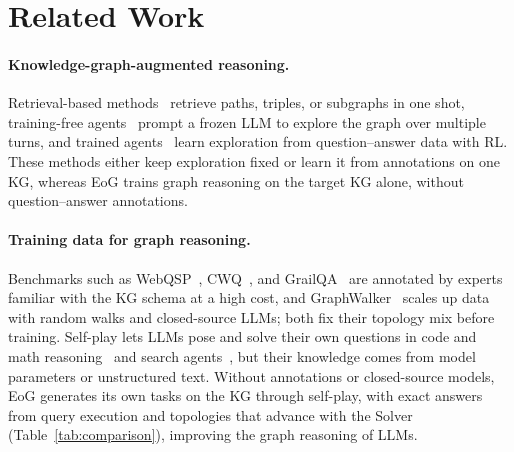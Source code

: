 \section{Related Work}
\label{sec:related}


\paragraph{Knowledge-graph-augmented reasoning.}
Retrieval-based methods~\citep{RoG,SubGraphRAG,GCR,S-Path-RAG,TARD,RPO-RAG,WhentoTrust,GNN-RAG,PathMind,STEM,DBLP:conf/nips/YuLGTZ25,D-RAG} retrieve paths, triples, or subgraphs in one shot, training-free agents~\citep{ToG,PoG,Paths-over-Graph,Open-WorldKG-RAG,StructGPT,RFKG-CoT,Generate-on-Graph,iQUEST,Enrich-on-Graph,DMAR,CoG-Blueprints,DBLP:conf/acl/PolonuerVANCCZ26,Search-on-Graph,KG-IRAG,GoT} prompt a frozen LLM to explore the graph over multiple turns, and trained agents~\citep{KG-R1,Search-on-Graph-R1,Graph-RFT,ReasoningbyExploration,SymAgent,GraphWalker,KBQA-R1,kg-agent,kbqa-o1,EoG,GraphScout,DBLP:conf/acl/SongSYX26,KG-Reasoner,KG-Hopper} learn exploration from question--answer data with RL. These methods either keep exploration fixed or learn it from annotations on one KG, whereas EoG trains graph reasoning on the target KG alone, without question--answer annotations.

\paragraph{Training data for graph reasoning.}
Benchmarks such as WebQSP~\citep{webqsp}, CWQ~\citep{cwq}, and GrailQA~\citep{grailqa} are annotated by experts familiar with the KG schema at a high cost, and GraphWalker~\citep{GraphWalker} scales up data with random walks and closed-source LLMs; both fix their topology mix before training. Self-play lets LLMs pose and solve their own questions in code and math reasoning~\citep{absolutezero,rzero} and search agents~\citep{searchselfplay,DrZero}, but their knowledge comes from model parameters or unstructured text. Without annotations or closed-source models, EoG generates its own tasks on the KG through self-play, with exact answers from query execution and topologies that advance with the Solver (Table~\ref{tab:comparison}), improving the graph reasoning of LLMs.

